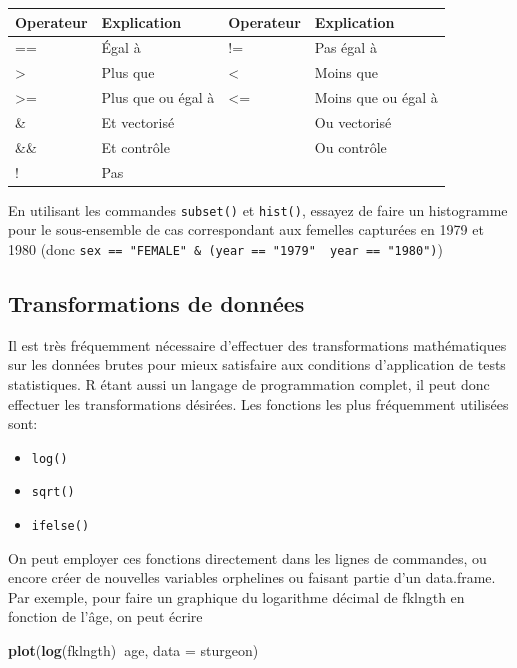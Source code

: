 \documentclass[12pt,]{book}
\makeatletter
\newenvironment{Shaded}{\begin{snugshade}}{\end{snugshade}}
\newcommand{\DataTypeTok}[1]{\textcolor[rgb]{0.13,0.29,0.53}{#1}}
\newcommand{\KeywordTok}[1]{\textcolor[rgb]{0.13,0.29,0.53}{\textbf{#1}}}
\newcommand{\NormalTok}[1]{#1}
\newcommand{\OperatorTok}[1]{\textcolor[rgb]{0.81,0.36,0.00}{\textbf{#1}}}
\providecommand{\tightlist}{%
  \setlength{\itemsep}{0pt}\setlength{\parskip}{0pt}}
\newenvironment{kframe}{%
\medskip{}
\setlength{\fboxsep}{.8em}
\def\at@end@of@kframe{}%
\ifinner\ifhmode%
 \def\at@end@of@kframe{\end{minipage}}%
 \begin{minipage}{\columnwidth}%
\fi\fi%
\def\FrameCommand##1{\hskip\@totalleftmargin \hskip-\fboxsep
\colorbox{incolor}{##1}\hskip-\fboxsep
    \hskip-\linewidth \hskip-\@totalleftmargin \hskip\columnwidth}%
\MakeFramed {\advance\hsize-\width
  \@totalleftmargin\z@ \linewidth\hsize
  \@setminipage}}%
{\par\unskip\endMakeFramed%
\at@end@of@kframe}
\newenvironment{rmdblock}[1]
 {
 \begin{itemize}
 \renewcommand{\labelitemi}{
   \raisebox{-.7\height}[0pt][0pt]{
     {\setkeys{Gin}{width=3em,keepaspectratio}\texttt{[image: images/\#1]}}
   }
 }
 \begin{kframe}
 \setlength{\fboxsep}{1em}
 \item
 }
 {
 \end{kframe}
 \end{itemize}
 }
\newenvironment{rmdcode}
  {\begin{rmdblock}{screen}}
  {\end{rmdblock}}
\makeatother
\begin{document}
\begin{longtable}[]{@{}llll@{}}
\toprule
Operateur & Explication & Operateur & Explication\tabularnewline
\midrule
\endhead
== & Égal à & != & Pas égal à\tabularnewline
\textgreater{} & Plus que & \textless{} & Moins que\tabularnewline
\textgreater{}= & Plus que ou égal à & \textless{}= & Moins que ou égal à\tabularnewline
\& & Et vectorisé & \textbar{} & Ou vectorisé\tabularnewline
\&\& & Et contrôle & \textbar{}\textbar{} & Ou contrôle\tabularnewline
! & Pas & &\tabularnewline
\bottomrule
\end{longtable}

\begin{rmdcode}
En utilisant les commandes \texttt{subset()} et \texttt{hist()}, essayez de faire un histogramme pour le sous-ensemble de cas correspondant aux femelles capturées en 1979 et 1980 (donc \texttt{sex\ ==\ "FEMALE"\ \&\ (year\ ==\ "1979"\ \textbar{}\ year\ ==\ "1980")})
\end{rmdcode}

\hypertarget{transformations-de-donnuxe9es}{%
\subsection{Transformations de données}\label{transformations-de-donnuxe9es}}

Il est très fréquemment nécessaire d'effectuer des transformations mathématiques sur les données brutes pour mieux satisfaire aux conditions d'application de tests statistiques.
R étant aussi un langage de programmation complet, il peut donc effectuer les transformations désirées.
Les fonctions les plus fréquemment utilisées sont:

\begin{itemize}
\tightlist
\item
  \texttt{log()}
\item
  \texttt{sqrt()}
\item
  \texttt{ifelse()}
\end{itemize}

On peut employer ces fonctions directement dans les lignes de commandes, ou encore créer de nouvelles variables orphelines ou faisant partie d'un data.frame.
Par exemple, pour faire un graphique du logarithme décimal de fklngth en fonction de l'âge, on peut écrire

\begin{Shaded}
\begin{Highlighting}[]
\KeywordTok{plot}\NormalTok{(}\KeywordTok{log}\NormalTok{(fklngth)}\OperatorTok{~}\NormalTok{age, }\DataTypeTok{data =}\NormalTok{ sturgeon)}
\end{Highlighting}
\end{Shaded}
\end{document}
